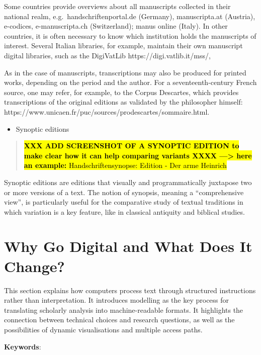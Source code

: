 \documentclass[
  letterpaper,
  DIV=11,
  numbers=noendperiod]{scrreprt}
\providecommand{\tightlist}{%
  \setlength{\itemsep}{0pt}\setlength{\parskip}{0pt}}\usepackage{longtable,booktabs,array}
\begin{document}
Some countries provide overviews about all manuscripts collected in
their national realm, e.g.~handschriftenportal.de (Germany),
manuscripta.at (Austria), e-codices, e-manuscripta.ch (Switzerland);
manus online (Italy). In other countries, it is often necessary to know
which institution holds the manuscripts of interest. Several Italian
libraries, for example, maintain their own manuscript digital libraries,
such as the DigiVatLib https://digi.vatlib.it/mss/,

As in the case of manuscripts, transcriptions may also be produced for
printed works, depending on the period and the author. For a
seventeenth-century French source, one may refer, for example, to the
Corpus Descartes, which provides transcriptions of the original editions
as validated by the philosopher himself:
https://www.unicaen.fr/puc/sources/prodescartes/sommaire.html.

\begin{itemize}
\tightlist
\item
  Synoptic editions
\end{itemize}

\begin{quote}
\hl{\textbf{XXX ADD SCREENSHOT OF A SYNOPTIC EDITION to make clear how
it can help comparing variants XXXX ---\textgreater{} here an example:}
Handschriftensynopse: Edition - Der arme Heinrich}
\end{quote}

Synoptic editions are editions that visually and programmatically
juxtapose two or more versions of a text. The notion of synopsis,
meaning a ``comprehensive view'', is particularly useful for the
comparative study of textual traditions in which variation is a key
feature, like in classical antiquity and biblical studies.

\section{Why Go Digital and What Does It
Change?}\label{why-go-digital-and-what-does-it-change}

This section explains how computers process text through structured
instructions rather than interpretation. It introduces modelling as the
key process for translating scholarly analysis into machine-readable
formats. It highlights the connection between technical choices and
research questions, as well as the possibilities of dynamic
visualisations and multiple access paths.

\textbf{Keywords}:
\end{document}
